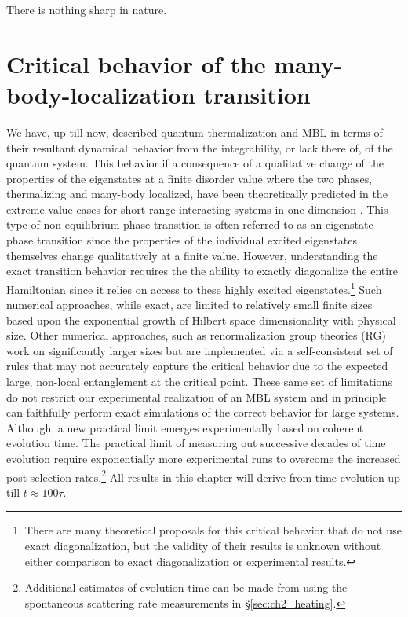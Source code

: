 \begin{savequote}[75mm]
There is nothing sharp in nature.
\end{savequote}

\chapter{Critical behavior of the \newline many-body-localization transition}
\label{sec:ch6}

We have, up till now, described quantum thermalization and MBL in terms of their resultant dynamical behavior from the integrability, or lack there of, of the quantum system. This behavior if a consequence of a qualitative change of the properties of the eigenstates at a finite disorder value where the two phases, thermalizing and many-body localized, have been theoretically predicted in the extreme value cases for short-range interacting systems in one-dimension \cite{Pal2010,Basko2006,Huse2013,Nandkishore2015,Imbrie2016,DAlessio2016}. This type of non-equilibrium phase transition is often referred to as an eigenstate phase transition since the properties of the individual excited eigenstates themselves change qualitatively at a finite value\cite{Pal2010,Huse2013}. However, understanding the exact transition behavior requires the the ability to exactly diagonalize the entire Hamiltonian since it relies on access to these highly excited eigenstates.\footnote{There are many theoretical proposals for this critical behavior that do not use exact diagonalization, but the validity of their results is unknown without either comparison to exact diagonalization or experimental results.} Such numerical approaches, while exact, are limited to relatively small finite sizes based upon the exponential growth of Hilbert space dimensionality with physical size\cite{Setiawan2017,Khemani2017}. Other numerical approaches, such as renormalization group theories (RG)\cite{Potter2015,Vosk2015,Zhang2018} work on significantly larger sizes but are implemented via a self-consistent set of rules that may not accurately capture the critical behavior due to the expected large, non-local entanglement at the critical point\cite{Alet2018,Abanin2018}. These same set of limitations do not restrict our experimental realization of an MBL system and in principle can faithfully perform exact simulations of the correct behavior for large systems. Although, a new practical limit emerges experimentally based on coherent evolution time. The practical limit of measuring out successive decades of time evolution require exponentially more experimental runs to overcome the increased post-selection rates.\footnote{Additional estimates of evolution time can be made from using the spontaneous scattering rate measurements in \S \ref{sec:ch2_heating}.} All results in this chapter will derive from time evolution up till $t\approx100\tau$.

